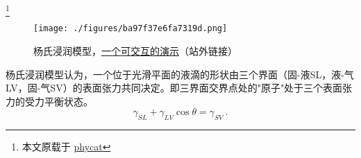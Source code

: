 
\begin{issues}
\issueDraft
\end{issues}

\footnote{本文原载于 \href{https://www.phycat.cn/archives/230/}{phycat}}

\begin{figure}[ht]
\centering
\texttt{[image: ./figures/ba97f37e6fa7319d.png]}
\caption{杨氏浸润模型，\href{https://www.phycat.cn/archives/230/}{一个可交互的演示}（站外链接）} \label{fig_YNGMDL_1}
\end{figure}
杨氏浸润模型认为，一个位于光滑平面的液滴的形状由三个界面（固-液SL，液-气LV，固-气SV）的表面张力共同决定。即三界面交界点处的"原子"处于三个表面张力的受力平衡状态。
\begin{equation}
\gamma_{SL}+\gamma_{LV}\cos\theta=\gamma_{SV}~.
\end{equation}
